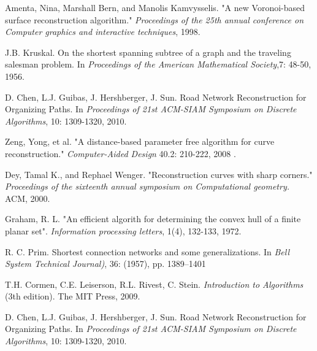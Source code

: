 \documentclass[11pt]{article}
\begin{document}
\begin{thebibliography}{50}


Amenta, Nina, Marshall Bern, and Manolis Kamvysselis.
"A new Voronoi-based surface reconstruction algorithm."
\textit{Proceedings of the 25th annual conference on Computer graphics and interactive techniques}, 1998.

J.B. Kruskal.
On the shortest spanning subtree of a graph and the traveling salesman problem.
In \emph{Proceedings of the American Mathematical Society},7: 48-50, 1956.

D. Chen, L.J. Guibas, J. Hershberger, J. Sun.
Road Network Reconstruction for Organizing Paths.
In \emph{Proceedings  of  21st  ACM-SIAM  Symposium  on  Discrete  Algorithms}, 10: 1309-1320, 2010.

Zeng, Yong, et al. "A distance-based parameter free algorithm for curve reconstruction." \textit{Computer-Aided Design} 40.2: 210-222, 2008 .

Dey, Tamal K., and Rephael Wenger. "Reconstruction curves with sharp corners." \textit{Proceedings of the sixteenth annual symposium on Computational geometry.} ACM, 2000.

Graham, R. L. "An efficient algorith for determining the convex hull of a finite planar set". \textit{Information processing letters}, 1(4), 132-133, 1972.

R. C. Prim.
Shortest connection networks and some generalizations.
In \emph{Bell System Technical Journal)}, 36: (1957), pp. 1389–1401

T.H. Cormen, C.E. Leiserson, R.L. Rivest, C. Stein.
\emph{Introduction to Algorithms} (3th edition).
The MIT Press, 2009.

D. Chen, L.J. Guibas, J. Hershberger, J. Sun.
Road Network Reconstruction for Organizing Paths.
In \emph{Proceedings of 21st ACM-SIAM Symposium on Discrete Algorithms}, 10: 1309-1320, 2010.

\end{thebibliography}
\end{document}
